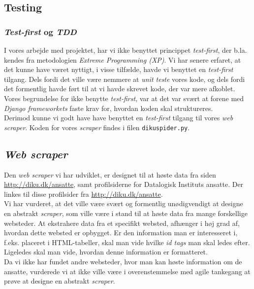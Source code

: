 \documentclass[12pt]{article}
\begin{document}
\subsection{Testing}
\subsubsection{\textit{Test-first} og \textit{TDD}}
I vores arbejde med projektet, har vi ikke benyttet princippet \textit{test-first}, der b.la. kendes fra metodologien \textit{Extreme Programming (XP)}.
Vi har senere erfaret, at det kunne have været nyttigt, i visse tilfælde, havde vi benyttet en \textit{test-first} tilgang. Dels fordi det ville være nemmere at \textit{unit teste} vores kode, og dels fordi det formentlig havde ført til at vi havde skrevet kode, der var mere afkoblet. \\
Vores begrundelse for ikke benytte \textit{test-first}, var at det var svært at forene med \textit{Django frameworkets} faste krav for, hvordan koden skal struktureres. \\
Derimod kunne vi godt have have benyttet en \textit{test-first} tilgang til vores \textit{web scraper}. Koden for vores \textit{scraper} findes i filen \texttt{dikuspider.py}.

\subsection{\textit{Web scraper}}
Den \textit{web scraper} vi har udviklet, er designet til at høste data fra siden \url{http://diku.dk/ansatte}, samt profilsiderne for Datalogisk Instituts ansatte. Der linkes til disse profilsider fra \url{http://diku.dk/ansatte}.\\
Vi har vurderet, at det ville være svært og formentlig unødigvendigt at designe en abstrakt \textit{scraper}, som ville være i stand til at høste data fra mange forskellige websteder. At ekstrahere data fra et specifikt websted, afhænger i høj grad af, hvordan dette websted er opbygget. Er den information man er interesseret i, f.eks. placeret i  HTML-tabeller, skal man vide hvilke \textit{id tags} man skal ledes efter. Ligeledes skal man vide, hvordan denne information er formatteret. \\
Da vi ikke har fundet andre websteder, hvor man kan høste information om de ansatte, vurderede vi at ikke ville være i overenstemmelse med agile tankegang at prøve at designe en abstrakt \textit{scraper}.
\end{document}
